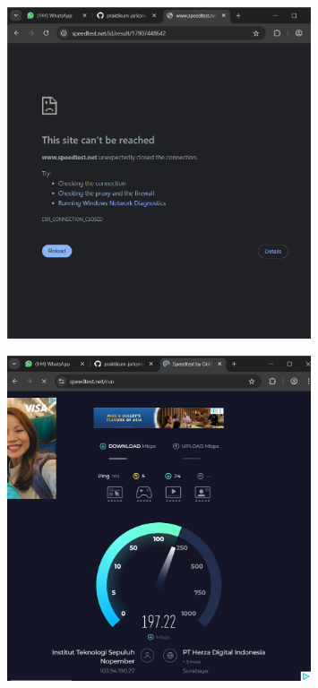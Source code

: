 \begin{figure}[H]
\centering
\includegraphics[width=0.8\textwidth]{P1/img/8.png}
 
\end{figure}
\begin{figure}[H]
\centering
\includegraphics[width=0.8\textwidth]{P1/img/9.png}

\end{figure}
